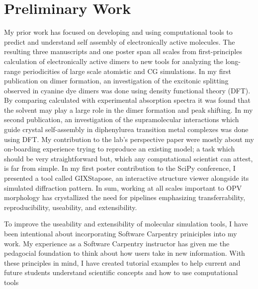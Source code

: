 \section*{Preliminary Work}

My prior work has focused on developing and using computational tools to predict and understand self assembly of electronically active molecules.
The resulting three manuscripts and one poster span all scales from first-principles calculation of electronically active dimers to new tools for analyzing the long-range periodicities of large scale atomistic and CG simulations.
In my first publication on dimer formation, an investigation of the excitonic splitting observed in cyanine dye dimers was done using density functional theory (DFT)\cite{Fothergill2018}.
By comparing calculated with experimental absorption spectra it was found that the solvent may play a large role in the dimer formation and peak shifting.
In my second publication, an investigation of the supramolecular interactions which guide crystal self-assembly in diphenylurea transition metal complexes was done using DFT\cite{Millard2019a}. 
My contribution to the lab's perspective paper were mostly about my on-boarding experience trying to reproduce an existing model; a task which should be very straightforward but, which any computational scientist can attest, is far from simple\cite{Jankowski2019}. 
In my first poster contribution to the SciPy conference, I presented a tool called GIXStapose, an interactive structure viewer alongside its simulated diffraction pattern\cite{gixstapose, scipy2020}.
In sum, working at all scales important to OPV morphology has crystallized the need for pipelines emphasizing transferrability, reproducibility, useability, and extensibility.

To improve the useability and extensibility of molecular simulation tools, I have been intentional about incorporating Software Carpentry priniciples into my work\cite{swc}.
My experience as a Software Carpentry instructor has given me the pedagocial foundation to think about how users take in new information.
With these principles in mind, I have created tutorial examples to help current and future students understand scientific concepts and how to use computational tools\cite{notebooktutorials}

